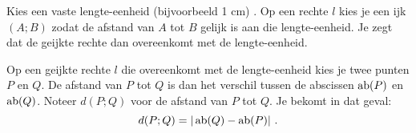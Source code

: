 
Kies een vaste lengte-eenheid (bijvoorbeeld 1 cm) .
Op een rechte $l$ kies je een ijk $(A;B)$ zodat de afstand van $A$ tot $B$ gelijk is aan die lengte-eenheid.
Je zegt dat de geijkte rechte dan overeenkomt met de lengte-eenheid.

Op een geijkte rechte $l$ die overeenkomt met de lengte-eenheid kies je twee punten $P$ en $Q$.
De afstand van $P$ tot $Q$ is dan het verschil tussen de abscissen $\operatorname{ab} (P)$ en $\operatorname{ab} (Q)$.
Noteer $d(P;Q)$ voor de afstand van $P$ tot $Q$.
Je bekomt in dat geval:
\[
d(P;Q)=\vert \operatorname{ab} (Q) - \operatorname{ab} (P) \vert \text { .}
\]

